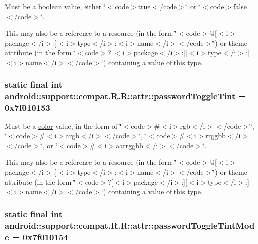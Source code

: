 Must be a boolean value, either \char`\"{}$<$code$>$true$<$/code$>$\char`\"{} or \char`\"{}$<$code$>$false$<$/code$>$\char`\"{}. 

This may also be a reference to a resource (in the form \char`\"{}$<$code$>$@\mbox{[}$<$i$>$package$<$/i$>$:\mbox{]}$<$i$>$type$<$/i$>$:$<$i$>$name$<$/i$>$$<$/code$>$\char`\"{}) or theme attribute (in the form \char`\"{}$<$code$>$?\mbox{[}$<$i$>$package$<$/i$>$:\mbox{]}\mbox{[}$<$i$>$type$<$/i$>$:\mbox{]}$<$i$>$name$<$/i$>$$<$/code$>$\char`\"{}) containing a value of this type. \hypertarget{classandroid_1_1support_1_1compat_1_1_r_1_1attr_d7ad0e2e9bf24c8be9c2e8bd51c9df6b}{
\subsubsection[{passwordToggleTint}]{\setlength{\rightskip}{0pt plus 5cm}static final int android::support::compat.R.R::attr::passwordToggleTint = 0x7f010153}}
\label{classandroid_1_1support_1_1compat_1_1_r_1_1attr_d7ad0e2e9bf24c8be9c2e8bd51c9df6b}


Must be a \hyperlink{classandroid_1_1support_1_1compat_1_1_r_1_1color}{color} value, in the form of \char`\"{}$<$code$>$\#$<$i$>$rgb$<$/i$>$$<$/code$>$\char`\"{}, \char`\"{}$<$code$>$\#$<$i$>$argb$<$/i$>$$<$/code$>$\char`\"{}, \char`\"{}$<$code$>$\#$<$i$>$rrggbb$<$/i$>$$<$/code$>$\char`\"{}, or \char`\"{}$<$code$>$\#$<$i$>$aarrggbb$<$/i$>$$<$/code$>$\char`\"{}. 

This may also be a reference to a resource (in the form \char`\"{}$<$code$>$@\mbox{[}$<$i$>$package$<$/i$>$:\mbox{]}$<$i$>$type$<$/i$>$:$<$i$>$name$<$/i$>$$<$/code$>$\char`\"{}) or theme attribute (in the form \char`\"{}$<$code$>$?\mbox{[}$<$i$>$package$<$/i$>$:\mbox{]}\mbox{[}$<$i$>$type$<$/i$>$:\mbox{]}$<$i$>$name$<$/i$>$$<$/code$>$\char`\"{}) containing a value of this type. \hypertarget{classandroid_1_1support_1_1compat_1_1_r_1_1attr_5cebeadd8d86f7264ae40c6e3dc204d9}{
\subsubsection[{passwordToggleTintMode}]{\setlength{\rightskip}{0pt plus 5cm}static final int android::support::compat.R.R::attr::passwordToggleTintMode = 0x7f010154}}
\label{classandroid_1_1support_1_1compat_1_1_r_1_1attr_5cebeadd8d86f7264ae40c6e3dc204d9}


